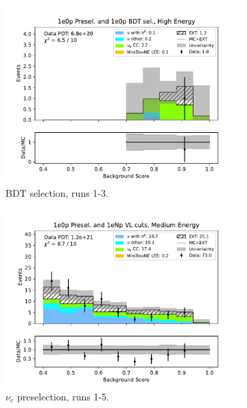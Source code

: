 \begin{figure}[H]
\begin{subfigure}{0.33\linewidth}
        \includegraphics[width=\linewidth]{technote/Sidebands/Figures/NearSideband/near_sideband_bkg_score_run123_ZP_ZPBDT_MEDIUM_ENERGY.pdf}
        \caption{BDT selection, runs 1-3.}
    \end{subfigure}
    \begin{subfigure}{0.33\linewidth}
        \includegraphics[width=\linewidth]{technote/Sidebands/Figures/NearSideband/near_sideband_bkg_score_run1234a4b4c4d5_ZP_ZP_MEDIUM_ENERGY.pdf}
        \caption{$\nu_e$ preselection, runs 1-5.}
    \end{subfigure}%
    \begin{subfigure}{0.33\linewidth}

\end{subfigure}
\end{figure}
